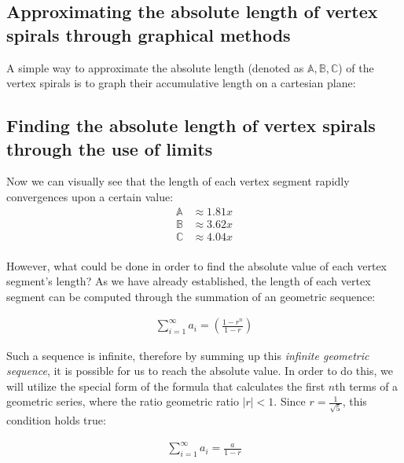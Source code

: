 \subsection{Approximating the absolute length of vertex spirals through graphical methods}
A simple way to approximate the absolute length (denoted as $\mathbb{A}, \mathbb{B}, \mathbb{C}$) of the vertex spirals is to graph their accumulative length on a cartesian plane:



\subsection{Finding the absolute length of vertex spirals through the use of limits}
Now we can visually see that the length of each vertex segment rapidly convergences upon a certain value:
\begin{equation}
    \begin{aligned}
        \mathbb{A} &\approx 1.81x \\
        \mathbb{B} &\approx 3.62x \\
        \mathbb{C} &\approx 4.04x \\
    \end{aligned}
\end{equation}

\noindent
However, what could be done in order to find the absolute value of each vertex segment's length? As we have already established, the length of each vertex segment can be computed through the summation of an geometric sequence:

\begin{equation}
    \begin{aligned}
        \sum_{i=1}^{\infty}a_i = \left(\frac{1-r^n}{1-r}\right)
    \end{aligned}
\end{equation}

Such a sequence is infinite, therefore by summing up this \emph{infinite geometric sequence}, it is possible for us to reach the absolute value. In order to do this, we will utilize the special form of the formula that calculates the first $n$th terms of a geometric series, where the ratio geometric ratio $|r| < 1$. Since $r = \frac{1}{\sqrt{5}}$, this condition holds true:

\begin{equation}
    \begin{aligned}
        \sum_{i=1}^{\infty}a_i=\frac{a}{1-r}
    \end{aligned}
\end{equation}

